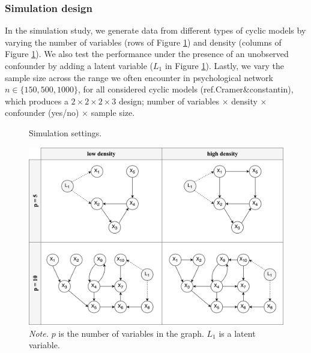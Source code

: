\documentclass[11pt]{article}
\theoremstyle{definition}
\begin{document}
\subsubsection{Simulation design}
In the simulation study, we generate data from different types of cyclic models by varying the number of variables (rows of Figure \ref{fig:11}) and density (columns of Figure \ref{fig:11}). We also test the performance under the presence of an unobserved confounder by adding a latent variable ($L_1$ in Figure \ref{fig:11}). Lastly, we vary the sample size across the range we often encounter in psychological network $n \in \{150, 500, 1000\}$, for all considered cyclic models (ref.Cramer\&constantin), which produces a $2 \times 2 \times 2 \times 3$ design; number of variables $\times$ density $\times$ confounder (yes/no) $\times$ sample size.


\begin{figure}[H]
    \centering
        \caption{Simulation settings.}
        \vspace{1mm}
        \includegraphics[width=1\textwidth]{figures/simsetting3.png}
        \caption*{\textit{Note.} $p$ is the number of variables in the graph.  $L_1$ is a latent variable.}
    \label{fig:11}
\end{figure}
\end{document}
